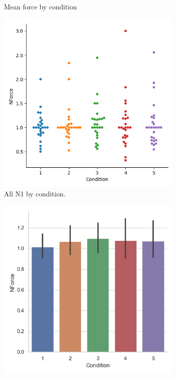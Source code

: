 \begin{figure}[H]
\begin{subfigure}[b]{0.4\textwidth}
         \caption{Mean force by condition}
         \label{fig:allForceMeanCond}
     \end{subfigure}          
     \hspace*{\fill}
     \begin{subfigure}[b]{0.4\textwidth}
         \centering
         \includegraphics[width=\textwidth]{Files/Plots/forceNforce_by_cond_swarm.png}
         \caption{All N1 by condition. }
         \label{fig:allN1NCond}
     \end{subfigure}
     \hspace*{\fill}
     \begin{subfigure}[b]{0.4\textwidth}
         \centering
         \includegraphics[width=\textwidth]{Files/Plots/forceNforce_mean_by_condition.png}

\end{subfigure}
\end{figure}

